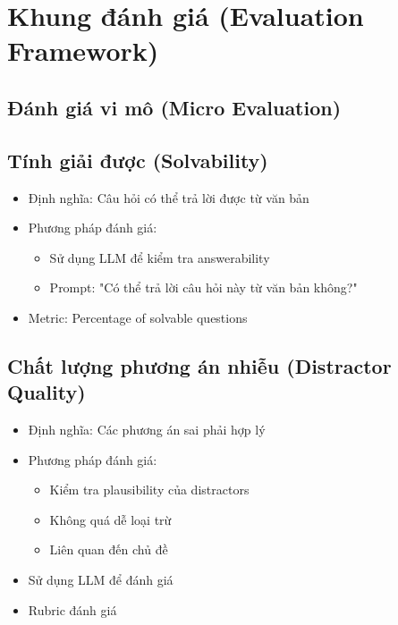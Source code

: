 \section{Khung đánh giá (Evaluation Framework)}

\subsection{Đánh giá vi mô (Micro Evaluation)}
\begin{itemize}

\subsection{Tính giải được (Solvability)}
\begin{itemize}
    \item Định nghĩa: Câu hỏi có thể trả lời được từ văn bản
    \item Phương pháp đánh giá:
    \begin{itemize}
        \item Sử dụng LLM để kiểm tra answerability
        \item Prompt: "Có thể trả lời câu hỏi này từ văn bản không?"
    \end{itemize}
    \item Metric: Percentage of solvable questions
\end{itemize}

\subsection{Chất lượng phương án nhiễu (Distractor Quality)}
\begin{itemize}
    \item Định nghĩa: Các phương án sai phải hợp lý
    \item Phương pháp đánh giá:
    \begin{itemize}
        \item Kiểm tra plausibility của distractors
        \item Không quá dễ loại trừ
        \item Liên quan đến chủ đề
    \end{itemize}
    \item Sử dụng LLM để đánh giá
    \item Rubric đánh giá
\end{itemize}


\end{itemize}
